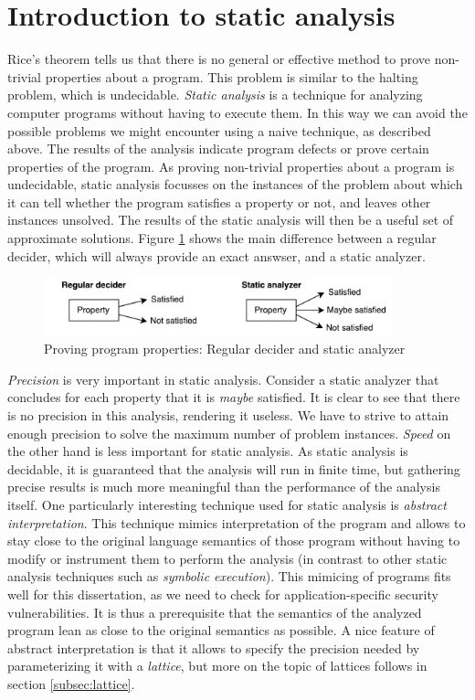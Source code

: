 \section{Introduction to static analysis}
\label{sec:staticAnalysis}
Rice's theorem tells us that there is no general or effective method to prove non-trivial properties about a program. This problem is similar to the halting problem, which is undecidable. \textit{Static analysis} is a technique for analyzing computer programs without having to execute them. In this way we can avoid the possible problems we might encounter using a naive technique, as described above. The results of the analysis indicate program defects or prove certain properties of the program. As proving non-trivial properties about a program is undecidable, static analysis focusses on the instances of the problem about which it can tell whether the program satisfies a property or not, and leaves other instances unsolved. The results of the static analysis will then be a useful set of approximate solutions. Figure \ref{fig:decider} shows the main difference between a regular decider, which will always provide an exact answser, and a static analyzer.

\begin{figure}[!h]
    \centering
      \includegraphics[width=0.9\textwidth]{images/decider} 
      \caption{Proving program properties: Regular decider and static analyzer}
    \label{fig:decider}
\end{figure}

\textit{Precision} is very important in static analysis. Consider a static analyzer that concludes for each property that it is \textit{maybe} satisfied. It is clear to see that there is no precision in this analysis, rendering it useless. We have to strive to attain enough precision to solve the maximum number of problem instances. \textit{Speed} on the other hand is less important for static analysis. As static analysis is decidable, it is guaranteed that the analysis will run in finite time, but gathering precise results is much more meaningful than the performance of the analysis itself. 
One particularly interesting technique used for static analysis is \textit{abstract interpretation}. This technique mimics interpretation of the program and allows to stay close to the original language semantics of those program without having to modify or instrument them to perform the analysis (in contrast to other static analysis techniques such as \textit{symbolic execution}). This mimicing of programs fits well for this dissertation, as we need to check for application-specific security vulnerabilities. It is thus a prerequisite that the semantics of the analyzed program lean as close to the original semantics as possible. A nice feature of abstract interpretation is that it allows to specify the precision needed by parameterizing it with a \textit{lattice}, but more on the topic of lattices follows in section \ref{subsec:lattice}. 

